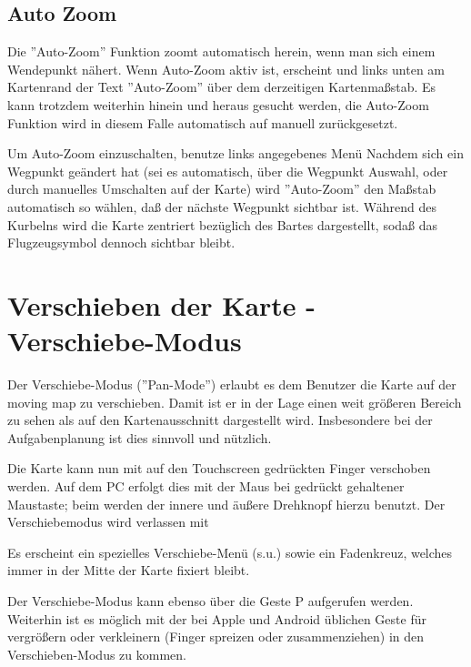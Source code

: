 \subsection*{Auto Zoom}\label{sec:AutoZoom}
Die ''Auto-Zoom'' Funktion zoomt automatisch herein, wenn man sich einem Wendepunkt nähert.
Wenn Auto-Zoom aktiv ist, erscheint und links unten am Kartenrand der Text ''Auto-Zoom'' über dem derzeitigen Kartenmaßstab.
Es kann trotzdem weiterhin hinein und heraus gesucht werden, die Auto-Zoom Funktion wird in diesem Falle automatisch auf manuell zurückgesetzt.

Um Auto-Zoom einzuschalten, benutze links angegebenes Menü
Nachdem sich ein Wegpunkt geändert hat (sei es automatisch, über die Wegpunkt Auswahl, oder durch manuelles Umschalten auf der Karte) wird ''Auto-Zoom'' den Maßstab automatisch so wählen, daß der nächste Wegpunkt sichtbar ist. Während des Kurbelns wird die Karte zentriert bezüglich des Bartes dargestellt, sodaß das Flugzeugsymbol dennoch sichtbar bleibt.

\section{Verschieben der Karte - Verschiebe-Modus}

Der Verschiebe-Modus (''Pan-Mode'') erlaubt es dem Benutzer die Karte auf der moving map zu verschieben. Damit ist er in der Lage einen weit größeren Bereich zu sehen als auf den Kartenausschnitt dargestellt wird. Insbesondere bei der Aufgabenplanung ist dies sinnvoll und nützlich.


 
Die Karte kann nun mit auf den Touchscreen gedrückten Finger verschoben werden. Auf dem \textsf{PC}  erfolgt dies mit der Maus bei gedrückt gehaltener Maustaste; beim \al werden der innere und äußere Drehknopf hierzu benutzt. Der Verschiebemodus wird verlassen mit 

Es erscheint ein spezielles Verschiebe-Menü (s.u.) sowie ein Fadenkreuz, welches immer in der Mitte der Karte fixiert bleibt.

Der Verschiebe-Modus kann ebenso über die Geste P  aufgerufen werden. Weiterhin ist es möglich mit der bei Apple und Android üblichen Geste 
für vergrößern oder verkleinern (Finger spreizen oder zusammenziehen) in den Verschieben-Modus  zu kommen.

